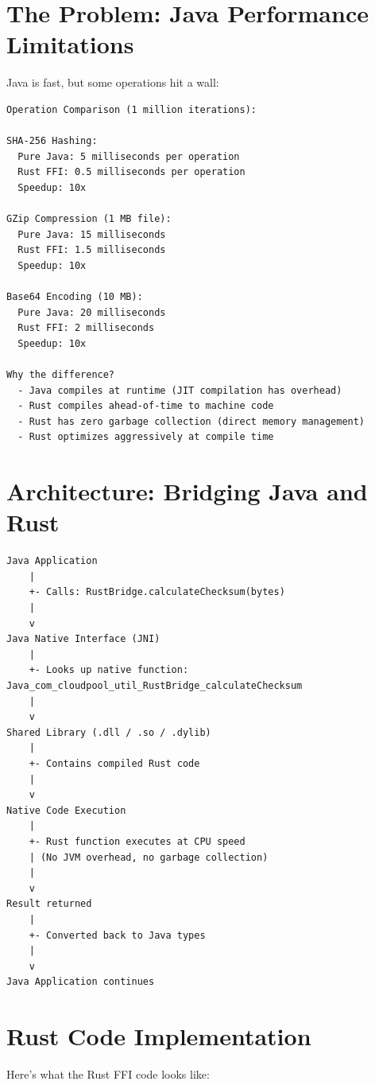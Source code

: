 \documentclass[11pt,a4paper]{report}
\begin{document}
\chapter{The Problem: Java Performance Limitations}


Java is fast, but some operations hit a wall:

\begin{lstlisting}[language=text]
Operation Comparison (1 million iterations):

SHA-256 Hashing:
  Pure Java: 5 milliseconds per operation
  Rust FFI: 0.5 milliseconds per operation
  Speedup: 10x

GZip Compression (1 MB file):
  Pure Java: 15 milliseconds
  Rust FFI: 1.5 milliseconds
  Speedup: 10x

Base64 Encoding (10 MB):
  Pure Java: 20 milliseconds
  Rust FFI: 2 milliseconds
  Speedup: 10x

Why the difference?
  - Java compiles at runtime (JIT compilation has overhead)
  - Rust compiles ahead-of-time to machine code
  - Rust has zero garbage collection (direct memory management)
  - Rust optimizes aggressively at compile time
\end{lstlisting}


\chapter{Architecture: Bridging Java and Rust}


\begin{lstlisting}[language=text]
Java Application
    |
    +- Calls: RustBridge.calculateChecksum(bytes)
    |
    v
Java Native Interface (JNI)
    |
    +- Looks up native function: Java_com_cloudpool_util_RustBridge_calculateChecksum
    |
    v
Shared Library (.dll / .so / .dylib)
    |
    +- Contains compiled Rust code
    |
    v
Native Code Execution
    |
    +- Rust function executes at CPU speed
    | (No JVM overhead, no garbage collection)
    |
    v
Result returned
    |
    +- Converted back to Java types
    |
    v
Java Application continues
\end{lstlisting}


\chapter{Rust Code Implementation}


Here's what the Rust FFI code looks like:
\end{document}
